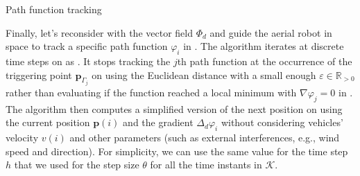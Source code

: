 \begin{algorithm}[h!] %

  \DontPrintSemicolon
  \vspace{.8ex}

  \vspace{1.6ex}

  \caption{Path function tracking}
  \label{algo:track}
\end{algorithm}

Finally, let's reconsider  with the vector field $\varPhi_d$ and guide the aerial robot in space to track a specific path function $\varphi_i$ in . The algorithm iterates at discrete time steps on  as . It stops tracking the $j$th path function at the occurrence of the triggering point $\mathbf{p}_{\Gamma_j}$ on  using the Euclidean distance with a small enough $\varepsilon\in\mathbb{R}_{>0}$ rather than evaluating if the function reached a local minimum with $\nabla\varphi_j=0$ in . The algorithm then computes a simplified version of the next position  on  using the current position $\mathbf{p}(i)$ and the gradient $\Delta_d\varphi_i$ without considering vehicles' velocity $v(i)$ and other parameters (such as external interferences, e.g., wind speed and direction). For simplicity, we can use the same value for the time step $h$ that we used for the step size $\theta$ for all the time instants in $\mathcal{K}$.

